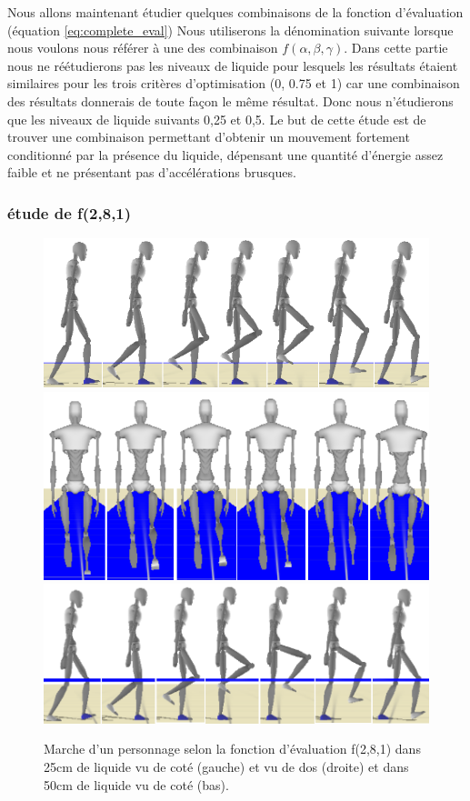 \documentclass[runningheads,a4paper]{llncs}
\begin{document}
Nous allons maintenant étudier quelques combinaisons de la fonction d'évaluation (équation \ref{eq:complete_eval}) Nous utiliserons la dénomination suivante lorsque nous voulons nous référer à une des combinaison $f(\alpha,\beta,\gamma)$. Dans cette partie nous ne réétudierons pas les niveaux de liquide pour lesquels les résultats étaient similaires pour les trois critères d'optimisation (0, 0.75 et 1) car une combinaison des résultats donnerais de toute façon le même résultat. Donc nous n'étudierons que les niveaux de liquide suivants 0,25 et 0,5. Le but de cette étude est de trouver une combinaison permettant d'obtenir un mouvement fortement conditionné par la présence du liquide, dépensant une quantité d'énergie assez faible et ne présentant pas d'accélérations brusques. 

\subsubsection{étude de f(2,8,1)}

\begin{figure}[h]
\centering
\includegraphics[scale=0.35]{strips/2_8_1_25cm.png}
\includegraphics[scale=0.35]{strips/2_8_1_25cm_from_back.png}
\includegraphics[scale=0.4]{strips/2_8_1_50cm.png}
\caption{Marche d'un personnage selon la fonction d'évaluation f(2,8,1) dans 25cm de liquide vu de coté (gauche) et vu de dos (droite) et dans 50cm de liquide vu de coté (bas). }
\label{fig:f281}
\end{figure}
\end{document}
